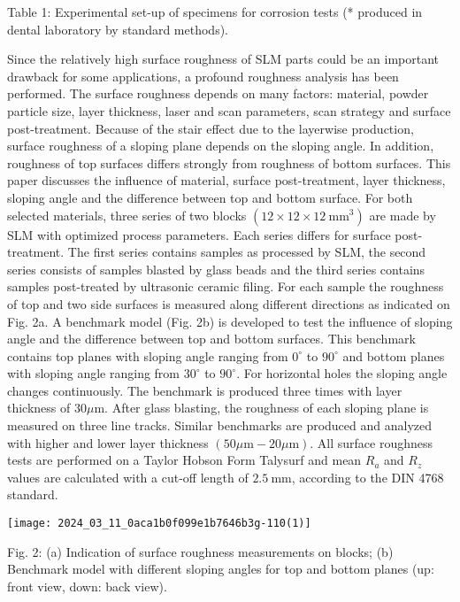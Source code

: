 \documentclass[10pt]{article}
\begin{document}
Table 1: Experimental set-up of specimens for corrosion tests (* produced in dental laboratory by standard methods).

Since the relatively high surface roughness of SLM parts could be an important drawback for some applications, a profound roughness analysis has been performed. The surface roughness depends on many factors: material, powder particle size, layer thickness, laser and scan parameters, scan strategy and surface post-treatment. Because of the stair effect due to the layerwise production, surface roughness of a sloping plane depends on the sloping angle. In addition, roughness of top surfaces differs strongly from roughness of bottom surfaces. This paper discusses the influence of material, surface post-treatment, layer thickness, sloping angle and the difference between top and bottom surface. For both selected materials, three series of two blocks $\left(12 \times 12 \times 12 \mathrm{~mm}^{3}\right)$ are made by SLM with optimized process parameters. Each series differs for surface post-treatment. The first series contains samples as processed by SLM, the second series consists of samples blasted by glass beads and the third series contains samples post-treated by ultrasonic ceramic filing. For each sample the roughness of top and two side surfaces is measured along different directions as indicated on Fig. 2a. A benchmark model (Fig. 2b) is developed to test the influence of sloping angle and the difference between top and bottom surfaces. This benchmark contains top planes with sloping angle ranging from $0^{\circ}$ to $90^{\circ}$ and bottom planes with sloping angle ranging from $30^{\circ}$ to $90^{\circ}$. For horizontal holes the sloping angle changes continuously. The benchmark is produced three times with layer thickness of $30 \mu \mathrm{m}$. After glass blasting, the roughness of each sloping plane is measured on three line tracks. Similar benchmarks are produced and analyzed with higher and lower layer thickness $(50 \mu \mathrm{m}-20 \mu \mathrm{m})$. All surface roughness tests are performed on a Taylor Hobson Form Talysurf and mean $R_{a}$ and $R_{z}$ values are calculated with a cut-off length of $2.5 \mathrm{~mm}$, according to the DIN 4768 standard.

\begin{center}
\texttt{[image: 2024\_03\_11\_0aca1b0f099e1b7646b3g-110(1)]}
\end{center}

Fig. 2: (a) Indication of surface roughness measurements on blocks; (b) Benchmark model with different sloping angles for top and bottom planes (up: front view, down: back view).
\end{document}
